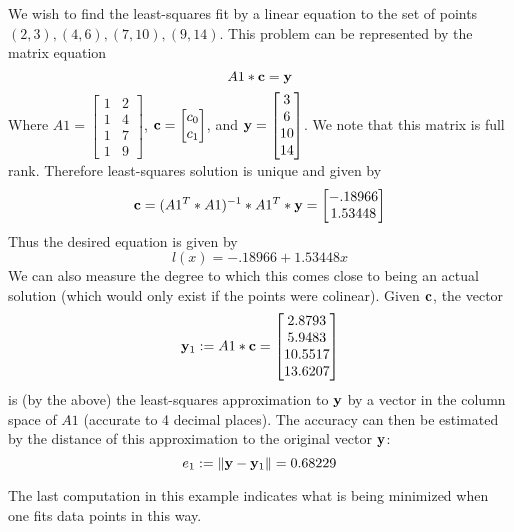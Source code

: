 \documentclass{ximera}
\begin{document}
\begin{example} We wish to find the least-squares fit by a linear equation to the set of points $(2,3), (4,6), (7,10), (9,14)$. This problem can be represented by the matrix equation
\[
A1*{\bf c} = {\bf y}
\]
Where $A1 = \begin{bmatrix} 1 & 2\\1 & 4\\1 & 7\\1 & 9\end{bmatrix}$, ${\bf c} = \begin{bmatrix}c_0\\c_1\end{bmatrix}$, and ${\bf y} = \begin{bmatrix} 3\\6\\10\\14\end{bmatrix}$. We note that this matrix is full rank. Therefore least-squares solution is unique and given by
\[
{\bf c} = (A1^T*A1)^{-1}*A1^T*{\bf y} = \begin{bmatrix}-.18966\\ 1.53448\end{bmatrix}
\]
Thus the desired equation is given by
\[
l(x) = -.18966 + 1.53448 x
\]
We can also measure the degree to which this comes close to being an actual solution (which would only exist if the points were colinear). Given $\bf c$, the vector
\[
{\bf y}_1 := A1*{\bf c} = \begin{bmatrix} 2.8793\\ 5.9483\\ 10.5517\\ 13.6207\end{bmatrix}
\]
is (by the above) the least-squares approximation to $\bf y$ by a vector in the column space of $A1$ (accurate to 4 decimal places). The accuracy can then be estimated by the distance of this approximation to the original vector $\bf y$:
\[
e_1 := \|{\bf y} - {\bf y}_1\| = 0.68229
\]
\end{example}

The last computation in this example indicates what is being minimized when one fits data points in this way. 
\end{document}
